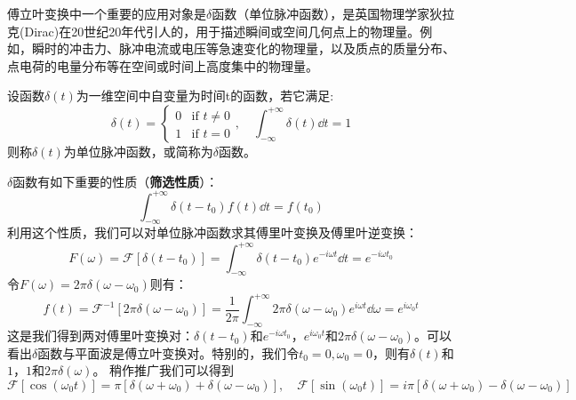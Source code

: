 傅立叶变换中一个重要的应用对象是$\delta$函数（单位脉冲函数），是英国物理学家狄拉克(Dirac)在20世纪20年代引人的，用于描述瞬间或空间几何点上的物理量。例如，瞬时的冲击力、脉冲电流或电压等急速变化的物理量，以及质点的质量分布、点电荷的电量分布等在空间或时间上高度集中的物理量。
\begin{definition}[单位脉冲函数]
设函数$\delta(t)$为一维空间中自变量为时间t的函数，若它满足:
\[\delta(t)=\left\{
\begin{array}{rl}0 & \text{if } t \neq 0\\
1 & \text{if } t=0
\end{array} \right., \quad \int_{-\infty}^{+\infty}\delta(t)\dd{t}=1\]
则称$\delta(t)$为单位脉冲函数，或简称为$\delta$函数。
\end{definition}
$\delta$函数有如下重要的性质（\textbf{筛选性质}）：
\[\int_{-\infty}^{+\infty}\delta(t-t_0)f(t)\dd{t}=f(t_0)\]
利用这个性质，我们可以对单位脉冲函数求其傅里叶变换及傅里叶逆变换：
\[F(\omega)=\mathcal{F}[\delta(t-t_0)]=\int_{-\infty}^{+\infty}\delta(t-t_0)e^{-i\omega t}\dd{t}=e^{-i\omega t_0}\]
令$F(\omega)=2\pi \delta(\omega-\omega_0)$则有： 
\[f(t)=\mathcal{F}^{-1}[2\pi \delta(\omega-\omega_0)]=\frac{1}{2\pi}\int_{-\infty}^{+\infty}2\pi \delta(\omega-\omega_0)e^{i\omega t}\dd{\omega}=e^{i\omega_0 t}\]
这是我们得到两对傅里叶变换对：$\delta(t-t_0)$和$e^{-i\omega t_0}$，$e^{i\omega_0 t}$和$2\pi \delta(\omega-\omega_0)$。可以看出$\delta$函数与平面波是傅立叶变换对。特别的，我们令$t_0=0,\omega_0=0$，则有$\delta(t)$和$1$，$1$和$2\pi \delta(\omega)$。
稍作推广我们可以得到
\[\mathcal{F}[\cos(\omega_0t)]=\pi[\delta(\omega+\omega_0)+\delta(\omega-\omega_0)], \quad \mathcal{F}[\sin(\omega_0t)]=i\pi[\delta(\omega+\omega_0)-\delta(\omega-\omega_0)]\]
